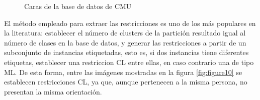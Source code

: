 \begin{figure}[bth]
	\myfloatalign
	 \quad
	 \quad
	 \quad
	\caption{Caras de la base de datos de  \ac{CMU} \cite{Survey:2007}}\label{fig:figure9}
\end{figure}

El método empleado para extraer las restricciones es uno de los más populares en la literatura: establecer el número de clusters de la partición resultado igual al número de clases en la base de datos, y generar las restricciones a partir de un subconjunto de instancias etiquetadas, esto es, si dos instancias tiene diferentes etiquetas, establecer una restriccion \acf{CL} entre ellas, en caso contrario una de tipo \acf{ML}. De esta forma, entre las imágenes mostradas en la figura \ref{fig:figure10} se establecen restricciones \acf{CL}, ya que, aunque pertenecen a la misma persona, no presentan la misma orientación.

